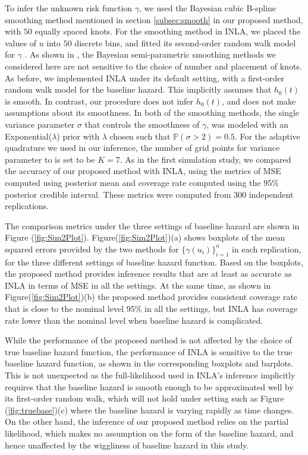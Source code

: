\documentclass[ba]{imsart}
\begin{document}
To infer the unknown risk function $\gamma$, we used the Bayesian cubic B-spline smoothing method mentioned in section \ref{subsec:smooth} in our proposed method, with $50$ equally spaced knots. For the smoothing method in INLA, we placed the values of $u$ into $50$ discrete bins, and fitted its second-order random walk model for $\gamma$ \citep{rw2}. As shown in \cite{casecross}, the Bayesian semi-parametric smoothing methods we considered here are not sensitive to the choice of number and placement of knots. 
As before, we implemented INLA under its default setting, with a first-order random walk model for the baseline hazard. This implicitly assumes that $h_{0}(t)$ is smooth. In contrast, our procedure does not infer $h_{0}(t)$, and does not make assumptions about its smoothness. In both of the smoothing methods, the single variance parameter $\sigma$ that controls the smoothness of $\gamma$, was modeled with an Exponential($\lambda$) prior with $\lambda$ chosen such that $\mathbb{P}\left( \sigma > 2\right) = 0.5$. For the adaptive quadrature we used in our inference, the number of grid points for variance parameter to is set to be $K = 7$. As in the first simulation study, we compared the accuracy of our proposed method with INLA, using the metrics of MSE computed using posterior mean and coverage rate computed using the $95\%$ posterior credible interval. These metrics were computed from 300 independent replications.

The comparison metrics under the three settings of baseline hazard are shown in Figure (\ref{fig:Sim2Plot}). Figure(\ref{fig:Sim2Plot})(a) shows boxplots of the mean squared errors provided by the two methods for $\{\gamma(u_i)\}_{i=1}^n$ in each replication, for the three different settings of baseline hazard function. Based on the boxplots, the proposed method provides inference results that are at least as accurate as INLA in terms of MSE in all the settings. At the same time, as shown in Figure(\ref{fig:Sim2Plot})(b) the proposed method provides consistent coverage rate that is close to the nominal level $95\%$ in all the settings, but INLA has coverage rate lower than the nominal level when baseline hazard is complicated. 

While the performance of the proposed method is not affected by the choice of true baseline hazard function, the performance of INLA is sensitive to the true baseline hazard function, as shown in the corresponding boxplots and barplots. This is not unexpected as the full-likelihood used in INLA's inference implicitly requires that the baseline hazard is smooth enough to be approximated well by its first-order random walk, which will not hold under setting such as Figure (\ref{fig:truebase})(c) where the baseline hazard is varying rapidly as time changes. On the other hand, the inference of our proposed method relies on the partial likelihood, which makes no assumption on the form of the baseline hazard, and hence unaffected by the wiggliness of baseline hazard in this study. 
\end{document}
